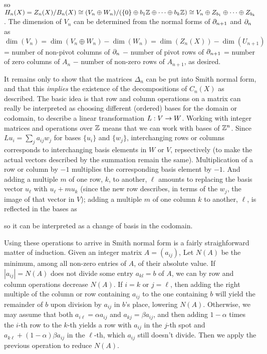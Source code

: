 \ssk

so $H_n(X)=Z_n(X)/B_n(X)\cong 
(V_n\oplus W_n)/(\{0\}\oplus b_1{\Bbb Z}\oplus\cdots\oplus b_k{\Bbb Z})\cong 
V_n\oplus Z_{b_1}\oplus\cdots\oplus Z_{b_k}$. The dimension of
$V_n$ can be determined from the normal forms of $\partial_{n+1}$ and
$\partial_n$ as
$\dim(V_n)=\dim(V_n\oplus W_n)-\dim(W_n)=\dim(Z_n(X))-\dim(U_{n+1})$ =
number of non-pivot columns of $\partial_n$ $-$ number of pivot rows of $\partial_{n+1}$ =
number of zero columns of $A_n$ $-$ number of non-zero rows of $A_{n+1}$,
as desired.


\msk

It remains only to show that the matrices $\Delta_n$ can be put into Smith normal form,
and that this {\it implies} the existence of the decompositions of $C_n(X)$ as described.
The basic idea is that row and column operations on a matrix can really be interpreted 
as choosing different (ordered) bases for the domain or codomain, 
to describe a linear transformation $L:V\rightarrow W$. Working with integer matrices and 
operations over 
${\Bbb Z}$ means that we can work with bases of ${\Bbb Z}^n$. Since $Lu_i=\sum_j a_{ij}w_j$ for
bases $\{u_i\}$ and $\{w_j\}$, interchanging rows or columns corresponds to interchanging
basis elements in $W$  or $V$, repsectively (to make the actual vectors described by the 
summation remain the same). Multiplication of a row or column by $-1$
multiplies the corresponding basis element by $-1$. And adding a multiple $m$ of
one row, $k$, to another, $\ell$ amounts to replacing the basis vector
$u_\ell$  with $u_\ell+mu_k$ (since the new row describes, in terms of the
$w_j$, the image of that vector in $V$); adding a multiple $m$ of 
one column $k$ to another, $\ell$, is reflected in the bases as

\ssk


\ssk

so it can be interpreted as a change of basis in the codomain. 

\msk

Using these operations to arrive in Smith normal form is a fairly 
straighforward matter of induction. Given an integer matrix $A=(a_{ij})$,
Let $N(A)$ be the minimum, among all non-zero entries of $A$, of their absolute value.
If $|a_{ij}|=N(A)$ does not divide some entry $a_{kl}=b$ of $A$, we can by row and column operations
decrease $N(A)$. If $i=k$ or $j=\ell$,
then adding the right multiple of the column or row containing $a_{ij}$ to the one containing $b$
will yield the remainder of $b$ upon division by $a_{ij}$ in $b$'s place, lowering $N(A)$.
Otherwise, we may assume that both $a_{i\ell}=\alpha a_{ij}$  and $a_{kj}=\beta a_{ij}$,
and then adding $1-\alpha$ times the $i$-th row  to the $k$-th yields a row with
$a_{ij}$ in the $j$-th spot and $a_{k\ell}+(1-\alpha)\beta a_{ij}$ in the $\ell$-th,
which $a_{ij}$ still doesn't divide. Then we apply the previous operation to reduce
$N(A)$.
\ssk


